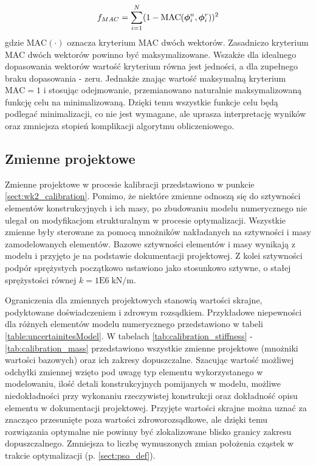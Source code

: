 \begin{equation} \label{eq:wk2_calib_f_mass}
	f_{MAC}=\sum_{i=1}^{N} (1-\text{MAC}(\bm{\phi}_i^n, \bm{\phi}_i^r))^2
\end{equation}
gdzie $\text{MAC}(\cdot)$ oznacza kryterium MAC dwóch wektorów. Zasadniczo kryterium MAC dwóch wektorów powinno być maksymalizowane. Wszakże dla idealnego dopasowania wektorów wartość kryterium równa jest jedności, a dla zupełnego braku dopasowania - zeru. Jednakże znając wartość maksymalną kryterium $\text{MAC}=1$ i stosując odejmowanie, przemianowano naturalnie maksymalizowaną funkcję celu na minimalizowaną. Dzięki temu wszystkie funkcje celu będą podlegać minimalizacji, co nie jest wymagane, ale uprasza interpretację wyników oraz zmniejsza stopień komplikacji algorytmu obliczeniowego.

\subsection{Zmienne projektowe}
Zmienne projektowe w procesie kalibracji przedstawiono w punkcie \ref{sect:wk2_calibration}. Pomimo, że niektóre zmienne odnoszą się do sztywności elementów konstrukcyjnych i ich masy, po zbudowaniu modelu numerycznego nie ulegał on modyfikacjom strukturalnym w procesie optymalizacji. Wszystkie zmienne były sterowane za pomocą mnożników nakładanych na sztywności i masy zamodelowanych elementów. Bazowe sztywności elementów i masy wynikają z modelu i przyjęto je na podstawie dokumentacji projektowej. Z kolei sztywności podpór sprężystych początkowo ustawiono jako stosunkowo sztywne, o stałej sprężystości równej $k=1\text{E}6\;\text{kN/m}$. 

Ograniczenia dla zmiennych projektowych stanowią wartości skrajne, podyktowane doświadczeniem i zdrowym rozsądkiem. Przykładowe niepewności dla różnych elementów modelu numerycznego przedstawiono w tabeli \ref{table:uncertainitesModel}. W tabelach \ref{tab:calibration_stiffness} - \ref{tab:calibration_mass} przedstawiono wszystkie zmienne projektowe (mnożniki wartości bazowych) oraz ich zakresy dopuszczalne. Szacując wartość możliwej odchyłki zmiennej wzięto pod uwagę typ elementu wykorzystanego w modelowaniu, ilość detali konstrukcyjnych pomijanych w modelu, możliwe niedokładności przy wykonaniu rzeczywistej konstrukcji oraz dokładność opisu elementu w dokumentacji projektowej. Przyjęte wartości skrajne można uznać za znacząco przesunięte poza wartości zdroworozsądkowe, ale dzięki temu rozwiązania optymalne nie powinny być zlokalizowane blisko granicy zakresu dopuszczalnego. Zmniejsza to liczbę wymuszonych zmian położenia cząstek w trakcie optymalizacji (p. \ref{sect:pso_def}).

